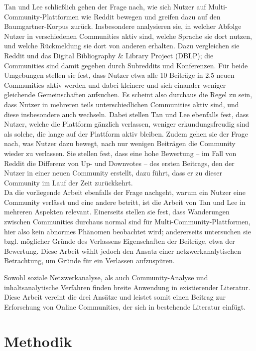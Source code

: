 \documentclass[11pt,a4paper,twoside]{article}
\begin{document}
Tan und Lee \autocite{Tan2015} schließlich gehen der Frage nach, wie
sich Nutzer auf Multi-Community-Plattformen wie Reddit bewegen und
greifen dazu auf den Baumgartner-Korpus zurück. Insbesondere analysieren
sie, in welcher Abfolge Nutzer in verschiedenen Communities aktiv sind,
welche Sprache sie dort nutzen, und welche Rückmeldung sie dort von
anderen erhalten. Dazu vergleichen sie Reddit und das Digital
Bibliography \& Library Project (DBLP); die Communities sind damit
gegeben durch Subreddits und Konferenzen. Für beide Umgebungen stellen
sie fest, dass Nutzer etwa alle 10 Beiträge in 2.5 neuen Communities
aktiv werden und dabei kleinere und sich einander weniger gleichende
Gemeinschaften aufsuchen. Es scheint also durchaus die Regel zu sein,
dass Nutzer in mehreren teils unterschiedlichen Communities aktiv sind,
und diese insbesondere auch wechseln. Dabei stellen Tan und Lee
ebenfalls fest, dass Nutzer, welche die Plattform gänzlich verlassen,
weniger erkundungsfreudig sind als solche, die lange auf der Plattform
aktiv bleiben. Zudem gehen sie der Frage nach, was Nutzer dazu bewegt,
nach nur wenigen Beiträgen die Community wieder zu verlassen. Sie
stellen fest, dass eine hohe Bewertung -- im Fall von Reddit die
Differenz von Up- und Downvotes -- des ersten Beitrags, den der Nutzer
in einer neuen Community erstellt, dazu führt, dass er zu dieser
Community im Lauf der Zeit zurückkehrt.\\
Da die vorliegende Arbeit ebenfalls der Frage nachgeht, warum ein Nutzer
eine Community verlässt und eine andere betritt, ist die Arbeit von Tan
und Lee in mehreren Aspekten relevant. Einerseits stellen sie fest, dass
Wanderungen zwischen Communities durchaus normal sind für
Multi-Community-Plattformen, hier also kein abnormes Phänomen beobachtet
wird; andererseits untersuchen sie bzgl. möglicher Gründe des Verlassens
Eigenschaften der Beiträge, etwa der Bewertung. Diese Arbeit wählt
jedoch den Ansatz einer netzwerkanalytischen Betrachtung, um Gründe für
ein Verlassen aufzuspüren.

Sowohl soziale Netzwerkanalyse, als auch Community-Analyse und
inhaltsanalytische Verfahren finden breite Anwendung in existierender
Literatur. Diese Arbeit vereint die drei Ansätze und leistet somit einen
Beitrag zur Erforschung von Online Communities, der sich in bestehende
Literatur einfügt.

\cleardoublepage

\hypertarget{methodik}{%
\section{Methodik}\label{methodik}}
\end{document}
